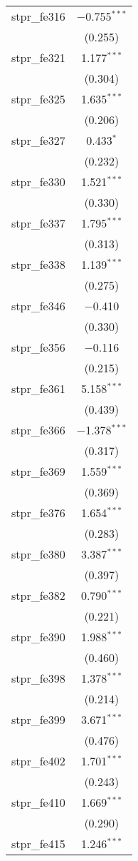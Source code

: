 \begin{table}[!htbp]
\begin{tabular}{@{\extracolsep{5pt}}lc}
  stpr\_fe316 & $-$0.755$^{***}$ \\ 
  & (0.255) \\ 
  stpr\_fe321 & 1.177$^{***}$ \\ 
  & (0.304) \\ 
  stpr\_fe325 & 1.635$^{***}$ \\ 
  & (0.206) \\ 
  stpr\_fe327 & 0.433$^{*}$ \\ 
  & (0.232) \\ 
  stpr\_fe330 & 1.521$^{***}$ \\ 
  & (0.330) \\ 
  stpr\_fe337 & 1.795$^{***}$ \\ 
  & (0.313) \\ 
  stpr\_fe338 & 1.139$^{***}$ \\ 
  & (0.275) \\ 
  stpr\_fe346 & $-$0.410 \\ 
  & (0.330) \\ 
  stpr\_fe356 & $-$0.116 \\ 
  & (0.215) \\ 
  stpr\_fe361 & 5.158$^{***}$ \\ 
  & (0.439) \\ 
  stpr\_fe366 & $-$1.378$^{***}$ \\ 
  & (0.317) \\ 
  stpr\_fe369 & 1.559$^{***}$ \\ 
  & (0.369) \\ 
  stpr\_fe376 & 1.654$^{***}$ \\ 
  & (0.283) \\ 
  stpr\_fe380 & 3.387$^{***}$ \\ 
  & (0.397) \\ 
  stpr\_fe382 & 0.790$^{***}$ \\ 
  & (0.221) \\ 
  stpr\_fe390 & 1.988$^{***}$ \\ 
  & (0.460) \\ 
  stpr\_fe398 & 1.378$^{***}$ \\ 
  & (0.214) \\ 
  stpr\_fe399 & 3.671$^{***}$ \\ 
  & (0.476) \\ 
  stpr\_fe402 & 1.701$^{***}$ \\ 
  & (0.243) \\ 
  stpr\_fe410 & 1.669$^{***}$ \\ 
  & (0.290) \\ 
  stpr\_fe415 & 1.246$^{***}$ \\ 

\end{tabular}
\end{table}

